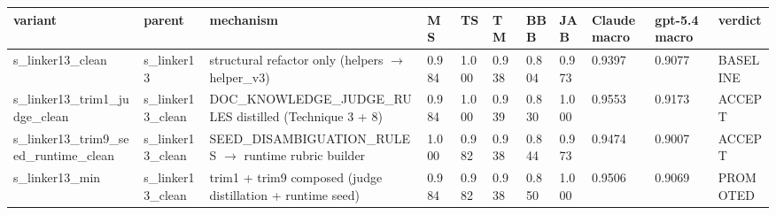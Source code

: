 \vspace{0.75em}
\begin{tabular}{lllllllllll}
\toprule
 variant                                & parent             & mechanism                                                 & MS    & TS    & TM    & BBB   & JAB   & Claude macro & gpt-5.4 macro & verdict       \\
\midrule
 s\_linker13\_clean                     & s\_linker13        & structural refactor only (helpers $\to$ helper\_v3)         & 0.984 & 1.000 & 0.938 & 0.804 & 0.973 & 0.9397       & 0.9077        & BASELINE      \\
 s\_linker13\_trim1\_judge\_clean       & s\_linker13\_clean & DOC\_KNOWLEDGE\_JUDGE\_RULES distilled (Technique 3 + 8)    & 0.984 & 1.000 & 0.939 & 0.830 & 1.000 & 0.9553       & 0.9173        & ACCEPT        \\
 s\_linker13\_trim9\_seed\_runtime\_clean & s\_linker13\_clean & SEED\_DISAMBIGUATION\_RULES $\to$ runtime rubric builder    & 1.000 & 0.982 & 0.938 & 0.844 & 0.973 & 0.9474       & 0.9007        & ACCEPT        \\
 s\_linker13\_min                       & s\_linker13\_clean & trim1 + trim9 composed (judge distillation + runtime seed) & 0.984 & 0.982 & 0.938 & 0.850 & 1.000 & 0.9506       & 0.9069        & PROMOTED      \\
\bottomrule
\end{tabular}

